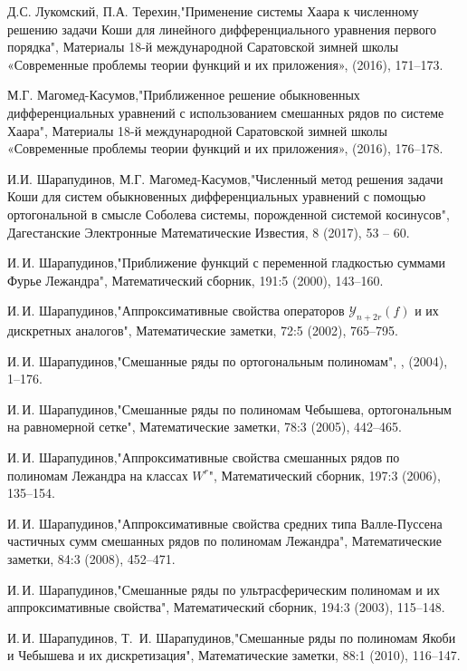 \begin{thebibliography}{20}
Д.С. Лукомский, П.А. Терехин,"Применение системы Хаара к численному решению задачи Коши для линейного дифференциального уравнения первого порядка", Материалы 18-й международной Саратовской зимней школы «Современные проблемы теории функций и их приложения»,  (2016), 171--173.

М.Г. Магомед-Касумов,"Приближенное решение обыкновенных дифференциальных уравнений с использованием смешанных рядов по системе Хаара", Материалы 18-й международной Саратовской зимней школы «Современные проблемы теории функций и их приложения»,  (2016), 176--178.

И.И. Шарапудинов, М.Г. Магомед-Касумов,"Численный метод решения задачи Коши для систем обыкновенных дифференциальных уравнений с помощью ортогональной в смысле Соболева системы, порожденной системой косинусов", Дагестанские Электронные Математические Известия, 8 (2017), 53 -- 60.

И.\,И. Шарапудинов,"Приближение функций с переменной гладкостью суммами Фурье Лежандра", Математический сборник, 191:5 (2000), 143--160.

И.\,И. Шарапудинов,"Аппроксимативные свойства операторов $\mathcal{Y}_{n+2r}(f)$ и их дискретных аналогов", Математические заметки, 72:5 (2002), 765--795.

И.\,И. Шарапудинов,"Смешанные ряды по ортогональным полиномам", ,  (2004), 1--176.

И.\,И. Шарапудинов,"Смешанные ряды по полиномам Чебышева, ортогональным на равномерной сетке", Математические заметки, 78:3 (2005), 442--465.

И.\,И. Шарапудинов,"Аппроксимативные свойства смешанных рядов по полиномам Лежандра на классах $W^r$", Математический сборник, 197:3 (2006), 135–154.

И.\,И. Шарапудинов,"Аппроксимативные свойства средних типа Валле-Пуссена частичных сумм смешанных рядов по полиномам Лежандра", Математические заметки, 84:3 (2008), 452--471.

И.\,И. Шарапудинов,"Смешанные ряды по ультрасферическим полиномам и их аппроксимативные свойства", Математический сборник, 194:3 (2003), 115--148.

И.\,И. Шарапудинов, Т.\, И. Шарапудинов,"Смешанные ряды по полиномам Якоби и Чебышева и их дискретизация", Математические заметки, 88:1 (2010), 116--147.


\end{thebibliography}
